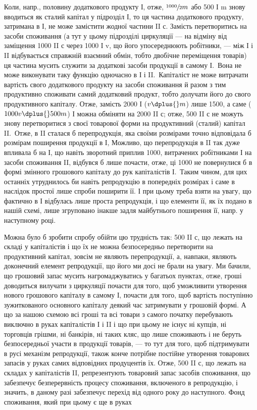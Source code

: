 
Коли, напр., половину додаткового продукту І, отже, $\sfrac{1000}{2} m$ або
500 І m знову вводиться як сталий капітал у підрозділ І, то ця частина
додаткового продукту, затримана в І, не може замістити жодної частини
II с. Замість перетворитись на засоби споживання (а тут у цьому підрозділі
циркуляції — на відміну від заміщення 1000 II с через 1000 І v,
що його упосереднюють робітники, — між І і II відбувається справжній
взаємний обмін, тобто двобічне переміщення товарів) ця частина мусить
служити за додаткові засоби продукції в самому І.~Вона не може виконувати
таку функцію одночасно в І і II.~Капіталіст не може витрачати
вартість свого додаткового продукту на засоби споживання й разом
з тим продуктивно споживати самий додатковий продукт, тобто долучати
його до свого продуктивного капіталу. Отже, замість 2000 І ($v \dplus{} m$)
лише 1500, а саме ($1000 v \dplus{} 500 m$) І можна обміняти на 2000 II с;
отже, 500 II с не можуть знову перетворитися з своєї товарової форми
на продуктивний (сталий) капітал II.~Отже, в II сталася б перепродукція,
яка своїми розмірами точно відповідала б розмірам поширення продукції
в І, Можливо, що перепродукція в II так дуже впливала б на І,
що навіть зворотний приплив 1000, витрачених робітниками І на засоби
споживання II, відбувся б лише почасти, отже, ці 1000 не повернулися б
в формі змінного грошового капіталу до рук капіталістів І.~Таким чином,
для цих останніх утруднилось би навіть репродукцію в попередніх
розмірах і саме в наслідок простої лише спроби поширити її. І при цьому
треба взяти на увагу, що фактично в І відбулась лише проста репродукція,
і що елементи її, як їх подано в нашій схемі, лише згруповано інакше
задля майбутнього поширення її, напр. у наступному році.

Можна було б зробити спробу обійти цю трудність так: 500 II с,
що лежать на складі у капіталістів і що їх не можна безпосередньо
перетворити на продуктивний капітал, зовсім не являють перепродукції,
а, навпаки, являють доконечний елемент репродукції, що його ми досі
не брали на увагу. Ми бачили, що грошовий запас мусить нагромаджуватись
у багатьох пунктах, отже, гроші доводиться вилучати з циркуляції
почасти для того, щоб уможливити утворення нового грошового
капіталу в самому І, почасти для того, щоб вартість поступінно
зужиткованого основного капіталу деякий час затримувати у грошовій
формі. А що за нашою схемою всі гроші та всі товари з самого
початку перебувають виключно в руках капіталістів І і II і що
при цьому не існує ні купців, ні торговців грішми, ні банкірів, ні таких
кляс, що лише споживають і не беруть безпосередньої участи в продукції
товарів, — то тут для того, щоб підтримувати в русі механізм репродукції,
також конче потрібне постійне утворення товарових запасів
у руках самих відповідних продуцентів їх. Отже, 500 II с, що лежать
на складах у капіталістів II, репрезентують товаровий запас засобів споживання,
що забезпечує безперервність процесу споживання, включеного
в репродукцію, і значить, в даному разі забезпечує перехід від одного
року до наступного. Фонд споживання, який при цьому є ще в руках
\parbreak{}  %
